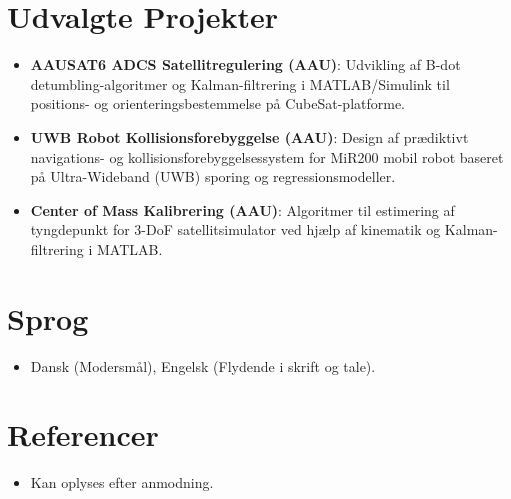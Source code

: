 \documentclass[11pt,a4paper,sans]{moderncv}
\begin{document}
\vspace{3pt}



\section{Udvalgte Projekter}
\vspace{1pt}
\begin{itemize}

\item{\textbf{AAUSAT6 ADCS Satellitregulering (AAU)}: Udvikling af B-dot detumbling-algoritmer og Kalman-filtrering i MATLAB/Simulink til positions- og orienteringsbestemmelse på CubeSat-platforme.}

\item{\textbf{UWB Robot Kollisionsforebyggelse (AAU)}: Design af prædiktivt navigations- og kollisionsforebyggelsessystem for MiR200 mobil robot baseret på Ultra-Wideband (UWB) sporing og regressionsmodeller.}

\item{\textbf{Center of Mass Kalibrering (AAU)}: Algoritmer til estimering af tyngdepunkt for 3-DoF satellitsimulator ved hjælp af kinematik og Kalman-filtrering i MATLAB.}

\end{itemize}


\section{Sprog}
\vspace{1pt}
\begin{itemize}
\item Dansk (Modersmål), Engelsk (Flydende i skrift og tale).
\end{itemize}


\section{Referencer}
\vspace{1pt}
\begin{itemize}
\item Kan oplyses efter anmodning.
\end{itemize}
\end{document}
